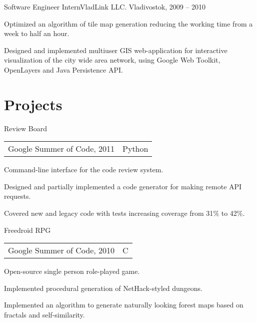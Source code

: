 \documentclass[11pt,a4paper]{article}
\begin{document}
\begin{multicols}{2}
  \begin{project1}{Software Engineer Intern}{VladLink LLC. Vladivostok, 2009 -- 2010}
    \begin{items}
    \item Optimized an algorithm of tile map generation reducing the
      working time from a week to half an hour.
    \item Designed and implemented multiuser GIS web-application for
      interactive visualization of the city wide area network, using Google Web
      Toolkit, OpenLayers and Java Persistence API.
    \end{items}
  \end{project1}

\end{multicols}

\section{Projects}
\begin{multicols}{2}
  \raggedcolumns
  \begin{project2}{Review Board}{\begin{tabular}{@{}l|l}Google Summer of Code, 2011 & Python\\\end{tabular}}
    Command-line interface for the code review system.
    \begin{items}
    \item Designed and partially implemented a code generator for making remote API requests.
    \item Covered new and legacy code with tests increasing coverage from 31$\%$ to 42$\%$.
    \end{items}
  \end{project2}

  \columnbreak

  \begin{project2}{Freedroid RPG}{\begin{tabular}{@{}l|l}Google Summer of Code, 2010 & C\\\end{tabular}}
    Open-source single person role-played game.
    \begin{items}
    \item Implemented procedural generation of NetHack-styled dungeons.
    \item Implemented an algorithm to generate naturally looking forest maps based on fractals and self-similarity.
    \end{items}
  \end{project2}

\end{multicols}
\end{document}
